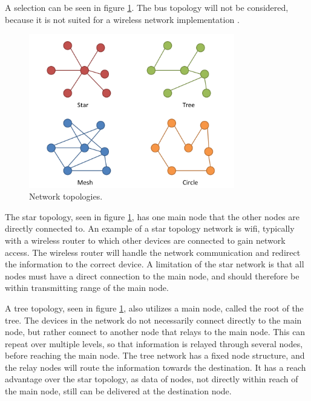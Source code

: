 A selection can be seen in figure \ref{fig:topologies}. The bus topology will not be considered, because it is not suited for a wireless network implementation . 

\begin{figure}[h!]
	\centering
	\includegraphics[width=0.8\textwidth]{figures/topologies.png}
	\caption{Network topologies.}
	\label{fig:topologies}
\end{figure}

The star topology, seen in figure \ref{fig:topologies}, has one main node that the other nodes are directly connected to. An example of a star topology network is wifi, typically with a wireless router to which other devices are connected to gain network access. The wireless router will handle the network communication and redirect the information to the correct device. A limitation of the star network is that all nodes must have a direct connection to the main node,  and should therefore be within transmitting range of the main node. %

A tree topology, seen in figure \ref{fig:topologies}, also utilizes a main node, called the root of the tree. The devices in the network do not necessarily connect directly to the main node, but rather connect to another node that relays to the main node. This can repeat over multiple levels, so that information is relayed through several nodes, before reaching the main node. The tree network has a fixed node structure, and the relay nodes will route the information towards the destination.  It has a reach advantage over the star topology, as data of nodes, not directly within reach of the main node, still can be delivered at the destination node.

